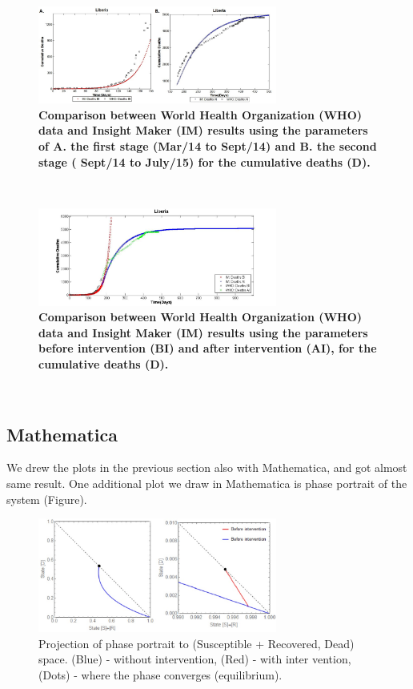 \documentclass[10pt]{article}
\begin{document}
\begin{figure}[!h]
  \centering
  \includegraphics[width=0.7\textwidth]{LB_BI_AI_SD_WHO_IM}
  \caption{ \bf Comparison between World Health Organization (WHO) data and Insight Maker (IM) results using the parameters of A. the first stage (Mar/14 to Sept/14) and B. the second stage ( Sept/14 to July/15) for the cumulative deaths (D).}
\label{fig:LB_IM_WHO} 
\end{figure}\\



\begin{figure}[!h]
  \centering
  \includegraphics[width=0.7\textwidth]{LB_Int2_SD_WHO_IM}
  \caption{ \bf Comparison between World Health Organization (WHO) data and Insight Maker (IM) results using the parameters before intervention (BI) and after intervention (AI), for the cumulative deaths (D).}
\label{fig:LB_IM_WHO2} 
\end{figure}\\


\newpage
\subsection{Mathematica}
We drew the plots in the previous section also with Mathematica, and got almost same result. One additional plot we draw in Mathematica is phase portrait of the system (Figure).

\begin{figure}[!h]
  \centering
  \includegraphics[width=0.7\textwidth]{PhasePortrait}
  \caption{Projection of phase portrait to (Susceptible + Recovered, Dead) space. (Blue) - without intervention, (Red) - with inter vention, (Dots) - where the phase converges (equilibrium).}
\label{fig:Phase Portrait}
\end{figure}
\end{document}
